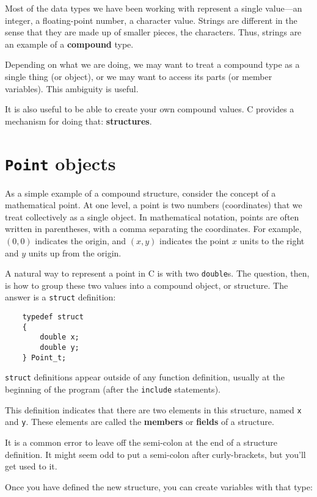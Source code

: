 Most of the data types we have been working with represent a single
value---an integer, a floating-point number, a character value. 
Strings are different in the sense that they are made up of smaller
pieces, the characters.  Thus, strings are an example of a
{\bf compound} type. 

Depending on what we are doing, we may want to treat a compound type
as a single thing (or object), or we may want to access its parts (or
member variables).  This ambiguity is useful.

It is also useful to be able to create your own compound values.  
C provides a mechanism for doing that: {\bf structures}.  

\section{{\tt Point} objects}

As a simple example of a compound structure, consider the concept of a
mathematical point.  At one level, a point is two numbers
(coordinates) that we treat collectively as a single object.  In
mathematical notation, points are often written in parentheses, with a
comma separating the coordinates.  For example, $(0, 0)$ indicates the
origin, and $(x, y)$ indicates the point $x$ units to the right and
$y$ units up from the origin.

A natural way to represent a point in C is with two {\tt double}s.
The question, then, is how to group these two values into
a compound object, or structure.  The answer is a {\tt struct}
definition:

\begin{verbatim}
	typedef struct 
	{
		double x;
		double y;
	} Point_t;  
\end{verbatim}
%
{\tt struct} definitions appear outside of any function definition,
usually at the beginning of the program (after the {\tt include}
statements).

This definition indicates that there are two elements in this
structure, named {\tt x} and {\tt y}.  These elements are called
the {\bf members} or {\bf fields} of a structure.

It is a common error to leave off the semi-colon at the end of a
structure definition.  It might seem odd to put a semi-colon after
curly-brackets, but you'll get used to it.

Once you have defined the new structure, you can create variables
with that type:

